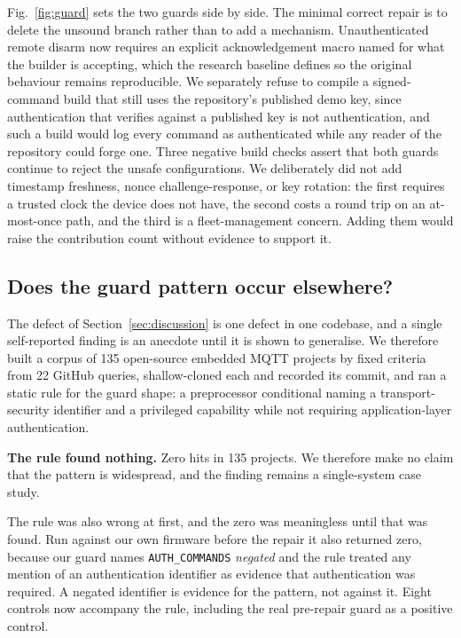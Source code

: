 Fig.~\ref{fig:guard} sets the two guards side by side. The minimal correct repair is to delete
the unsound branch rather than to add a mechanism.
Unauthenticated remote disarm now requires an explicit acknowledgement macro named for what the
builder is accepting, which the research baseline defines so the original behaviour remains
reproducible. We separately refuse to compile a signed-command build that still uses the
repository's published demo key, since authentication that verifies against a published key is
not authentication, and such a build would log every command as authenticated while any reader
of the repository could forge one. Three negative build checks assert that both guards continue
to reject the unsafe configurations. We deliberately did not add timestamp freshness, nonce
challenge-response, or key rotation: the first requires a trusted clock the device does not
have, the second costs a round trip on an at-most-once path, and the third is a fleet-management
concern. Adding them would raise the contribution count without evidence to support it.

\subsection{Does the guard pattern occur elsewhere?}
\label{sec:corpus}

The defect of Section~\ref{sec:discussion} is one defect in one codebase, and a single
self-reported finding is an anecdote until it is shown to generalise. We therefore built a
corpus of 135 open-source embedded MQTT projects by fixed criteria from 22 GitHub queries,
shallow-cloned each and recorded its commit, and ran a static rule for the guard shape: a
preprocessor conditional naming a transport-security identifier and a privileged capability
while not requiring application-layer authentication.

\textbf{The rule found nothing.} Zero hits in 135 projects. We therefore make no claim that the
pattern is widespread, and the finding remains a single-system case study.

The rule was also wrong at first, and the zero was meaningless until that was found. Run
against our own firmware before the repair it also returned zero, because our guard names
\texttt{AUTH\_COMMANDS} \emph{negated} and the rule treated any mention of an authentication
identifier as evidence that authentication was required. A negated identifier is evidence for
the pattern, not against it. Eight controls now accompany the rule, including the real
pre-repair guard as a positive control.


